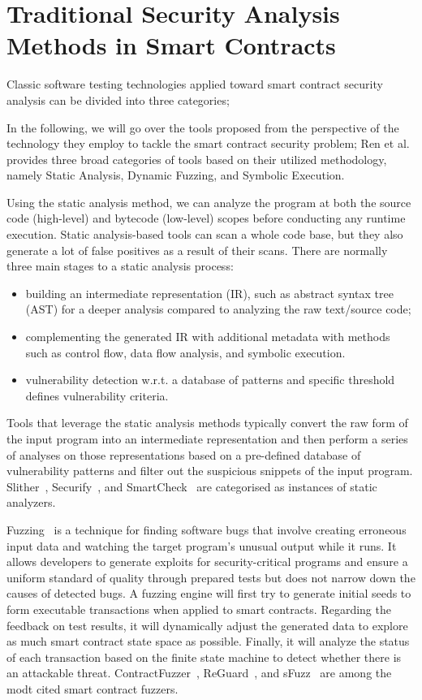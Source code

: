 \section{Traditional Security Analysis Methods in Smart Contracts}

Classic software testing technologies applied toward smart contract security analysis can be divided into three categories;

In the following, we will go over the tools proposed from the perspective of the technology they employ to tackle the smart contract security problem;
Ren et al.~\cite{Empirical-Evaluation-of-Smart-Contract-Testing:What-is-the-Best-Choice} provides three broad categories of tools based on their utilized methodology,
namely Static Analysis, Dynamic Fuzzing, and Symbolic Execution.

Using the static analysis method, we can analyze the program at both the source code (high-level) and bytecode (low-level) scopes before conducting any runtime execution.
Static analysis-based tools can scan a whole code base, but they also generate a lot of false positives as a result of their scans.
There are normally three main stages to a static analysis process:
\begin{itemize}
  \item building an intermediate representation (IR), such as abstract syntax tree (AST) for a deeper analysis compared to analyzing the raw text/source code;
  \item complementing the generated IR with additional metadata with methods such as control flow, data flow analysis, and symbolic execution.
  \item vulnerability detection w.r.t. a database of patterns and specific threshold defines vulnerability criteria.
\end{itemize}
Tools that leverage the static analysis methods typically convert the raw form of the input program into an intermediate representation and then perform a series of analyses on those representations based on a pre-defined database of vulnerability patterns and filter out the suspicious snippets of the input program.
Slither~\cite{slither}, Securify~\cite{securify}, and SmartCheck~\cite{securify} are categorised as instances of static analyzers.

Fuzzing~\cite{chen2018systematic} is a technique for finding software bugs that involve creating erroneous input data and watching the target program's unusual output while it runs.
It allows developers to generate exploits for security-critical programs and ensure a uniform standard of quality through prepared tests but does not narrow down the causes of detected bugs.
A fuzzing engine will first try to generate initial seeds to form executable transactions when applied to smart contracts. Regarding the feedback on test results,
it will dynamically adjust the generated data to explore as much smart contract state space as possible.
Finally, it will analyze the status of each transaction based on the finite state machine to detect whether there is an attackable threat.
ContractFuzzer~\cite{contractfuzzer}, ReGuard~\cite{liu2018reguard}, and sFuzz~\cite{nguyen2020sfuzz} are among the modt cited smart contract fuzzers.

